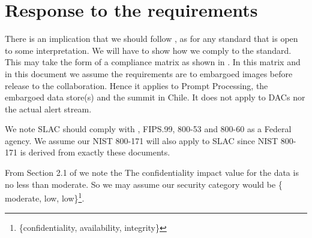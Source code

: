 \section{Response to the requirements}\label{sec:resp}

There is an implication that we should follow , as for any standard that is open to some interpretation.
We will have to show how we comply to the standard.
This may take the form of a compliance matrix as shown in .
In this matrix and in this document we assume the requirements are to embargoed images before release to the collaboration.
Hence it applies to Prompt Processing, the embargoed data store(s) and the summit in Chile. It does not apply to DACs nor the actual alert stream.

We note SLAC should comply with , FIPS.99, 800-53 and 800-60 as a Federal agency.
We assume our NIST 800-171  will also apply to SLAC since NIST 800-171 is derived from exactly these documents.

From Section 2.1 of  we note the The confidentiality impact value for the data  is no less than moderate.
So we may assume our  security category would be \{ moderate, low, low\}\footnote{\{confidentiality, availability, integrity\}}.









